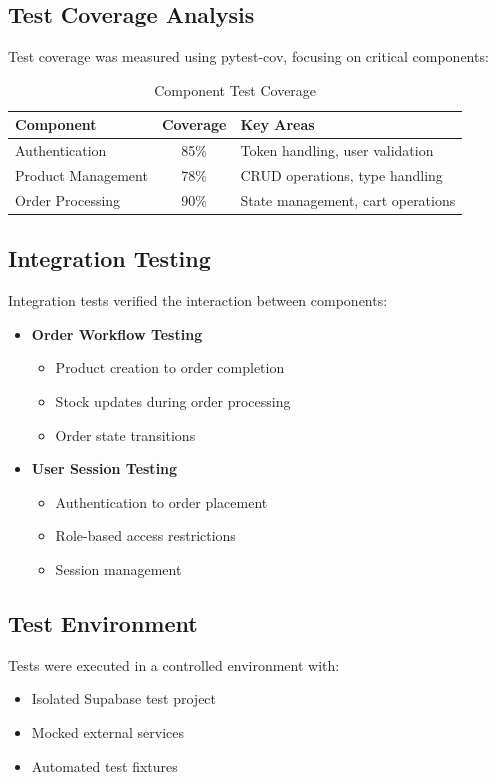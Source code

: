 \documentclass[12pt,a4paper]{article}
\begin{document}
\subsection{Test Coverage Analysis}
Test coverage was measured using pytest-cov, focusing on critical components:

\begin{table}[h]
\begin{tabular}{|l|c|l|}
\hline
\textbf{Component} & \textbf{Coverage} & \textbf{Key Areas} \\
\hline
Authentication & 85\% & Token handling, user validation \\
Product Management & 78\% & CRUD operations, type handling \\
Order Processing & 90\% & State management, cart operations \\
\hline
\end{tabular}
\caption{Component Test Coverage}
\end{table}

\subsection{Integration Testing}
Integration tests verified the interaction between components:

\begin{itemize}
    \item \textbf{Order Workflow Testing}
    \begin{itemize}
        \item Product creation to order completion
        \item Stock updates during order processing
        \item Order state transitions
    \end{itemize}

    \item \textbf{User Session Testing}
    \begin{itemize}
        \item Authentication to order placement
        \item Role-based access restrictions
        \item Session management
    \end{itemize}
\end{itemize}

\subsection{Test Environment}
Tests were executed in a controlled environment with:
\begin{itemize}
    \item Isolated Supabase test project
    \item Mocked external services
    \item Automated test fixtures
\end{itemize}
\end{document}
